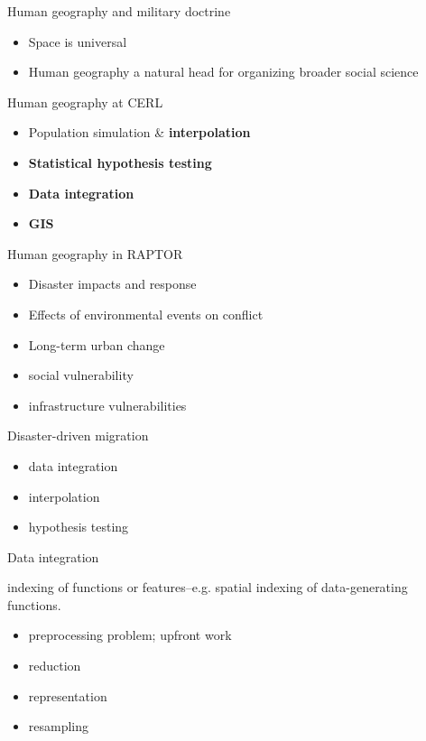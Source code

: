 \documentclass{beamer}
\begin{document}
\begin{frame}{Human geography and military doctrine}
  \begin{itemize}
  \item Space is universal
  \item Human geography a natural head for organizing broader social science
  \end{itemize}
\end{frame}


\begin{frame}{Human geography at CERL}
\begin{itemize}
\item Population simulation \& {\bf interpolation}
\item {\bf Statistical hypothesis testing}
\item {\bf Data integration}
\item {\bf GIS}
\end{itemize}
\end{frame}


\begin{frame}{Human geography in RAPTOR}
  \begin{itemize}
  \item Disaster impacts and response
  \item Effects of environmental events on conflict
  \item Long-term urban change
  \item social vulnerability
  \item infrastructure vulnerabilities
  \end{itemize}
\end{frame}


\begin{frame}{Disaster-driven migration}
  \begin{itemize}
  \item data integration
  \item interpolation
  \item hypothesis testing
  \end{itemize}
\end{frame}


\begin{frame}{Data integration}
  \begin{definition}
    indexing of functions or features--e.g. spatial indexing of data-generating functions.
  \end{definition}
  \begin{itemize}
  \item preprocessing problem; upfront work %
  \item reduction
  \item representation %
  \item resampling
  \end{itemize}
\end{frame}
\end{document}

